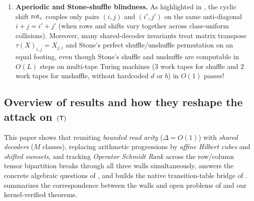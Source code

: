 \begin{enumerate}[label=\textbf{Wall \arabic*.},leftmargin=*]
  relied on extracting a monochromatic length-$r$ arithmetic progression in the stage-1 partition
  via the Hales--Jewett theorem \cite{HalesJewett1963}. Because Hales--Jewett numbers grow faster
  than primitive-recursively, that bound yields only $d - o(d)$ rank and collapses once $M_1$
  grows as slowly as $\log\log d$; worse, Behrend colorings \cite{Behrend1946} avoid $3$-term
  progressions with $M_1 = 2^{O(\sqrt{\log d})}$ classes, and random colorings cap monochromatic
  progressions at $O(\log d)$ even for $M_1 = 2$.
\item \textbf{Aperiodic and Stone-shuffle blindness.}
  As highlighted in \cite[Problems~9.1 and~9.5]{SeventeenthPaper2026}, the cyclic shift $\operatorname{rot}_c$
  couples only pairs $(i,j)$ and $(i',j')$ on the same anti-diagonal $i + j = i' + j'$ (when rows
  and shifts vary together across class-uniform collisions). Moreover,
  many shared-decoder invariants treat matrix transpose $\tau(X)_{i,j} = X_{j,i}$ and Stone's
  perfect shuffle/unshuffle permutation \cite{Stone1971} on an equal footing, even though Stone's
  shuffle and unshuffle are computable in $O(L)$ steps on multi-tape Turing machines ($3$ work tapes
  for shuffle and $2$ work tapes for unshuffle, without hardcoded $d$ or $b$) in $O(1)$ passes!
\end{enumerate}

\subsection{Overview of results and how they reshape the attack on \texorpdfstring{$(\mathsf{T})$}{(T)}}\label{sec:results-overview}

This paper shows that reuniting \emph{bounded read arity} ($\Delta = O(1)$) with \emph{shared
decoders} ($M$ classes), replacing arithmetic progressions by \emph{affine Hilbert cubes} and
\emph{shifted sumsets}, and tracking \emph{Operator Schmidt Rank} across the row/column tensor
bipartition breaks through all three walls simultaneously, answers the concrete algebraic
questions of \cite[Remark~5.6 and Problem~9.3]{SeventeenthPaper2026}, and builds the native
transition-table bridge of \cite[Problem~9.4]{SeventeenthPaper2026}. 
summarizes the correspondence between the walls and open problems of
\cite{SeventeenthPaper2026,SharedDecoders2026} and our kernel-verified theorems.

